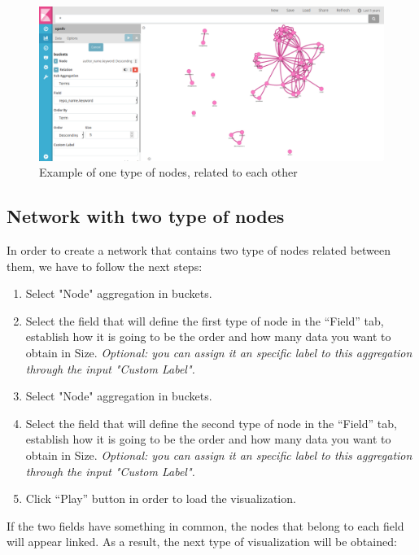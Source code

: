 \documentclass[a4paper, 12pt]{book}
\begin{document}
\begin{figure}[H]
  \centering
  \includegraphics[width=16cm, keepaspectratio]{img/results/nodesrelated}
  \caption{Example of one type of nodes, related to each other}
  \label{fig:nodesrelated}
\end{figure}

\subsection{Network with two type of nodes}

In order to create a network that contains two type of nodes related between them, we have to follow the next steps:

\begin{enumerate}
\item Select "Node" aggregation in buckets.
\item Select the field that will define the first type of node in the “Field” tab, establish how it is going to be the order and how many data you want to obtain in Size. \textit{Optional: you can assign it an specific label to this aggregation through the input "Custom Label". }
\item Select "Node" aggregation in buckets.
\item Select the field that will define the second type of node in the “Field” tab, establish how it is going to be the order and how many data you want to obtain in Size. \textit{Optional: you can assign it an specific label to this aggregation through the input "Custom Label". }
\item Click “Play” button in order to load the visualization.
\end{enumerate}

If the two fields have something in common, the nodes that belong to each field will appear linked. As a result, the next type of visualization will be obtained:
\end{document}

